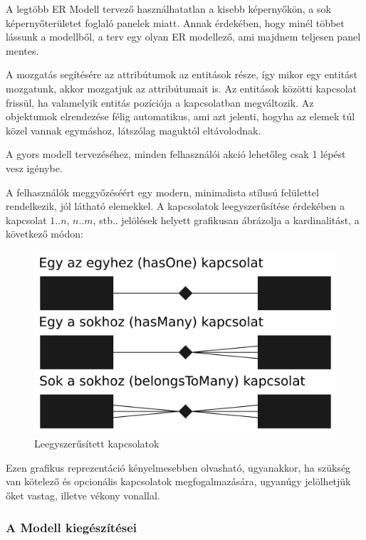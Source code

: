 \documentclass[a4paper,12pt,oneside]{report}
\begin{document}
\begin{justify}

	A legtöbb ER Modell tervező használhatatlan a kisebb képernyőkön, a sok képernyőterületet foglaló panelek miatt. Annak érdekében, hogy minél többet lássunk a modellből, a terv egy olyan ER modellező, ami majdnem teljesen panel mentes. 

	A mozgatás segítésére az attribútumok az entitások része, így mikor egy entitást mozgatunk, akkor mozgatjuk az attribútumait is. Az entitások közötti kapcsolat frissül, ha valamelyik entitás pozíciója a kapcsolatban megváltozik. Az objektumok elrendezése félig automatikus, ami azt jelenti, hogyha az elemek túl közel vannak egymáshoz, látszólag maguktól eltávolodnak.

	A gyors modell tervezéséhez, minden felhasználói akció lehetőleg csak 1 lépést vesz igénybe.

	A felhasználók meggyőzéséért egy modern, minimalista stílusú felülettel rendelkezik, jól látható elemekkel. A kapcsolatok leegyszerűsítése érdekében a kapcsolat $1..n$, $n..m$, stb.. jelölések helyett grafikusan ábrázolja a kardinalitást, a következő módon:

    \begin{figure}[h]
        \centering
		\includegraphics[width=12cm]{contents/images/simplified_relations.png}
		\caption{Leegyszerűsített kapcsolatok}
		\label{fig:simplified_relations}
	\end{figure}

	Ezen grafikus reprezentáció kényelmesebben olvasható, ugyanakkor, ha szükség van kötelező és opcionális kapcsolatok megfogalmazására, ugyanúgy jelölhetjük őket vastag, illetve vékony vonallal. 

\end{justify}

\newpage
\subsubsection{A Modell kiegészítései }
\end{document}
